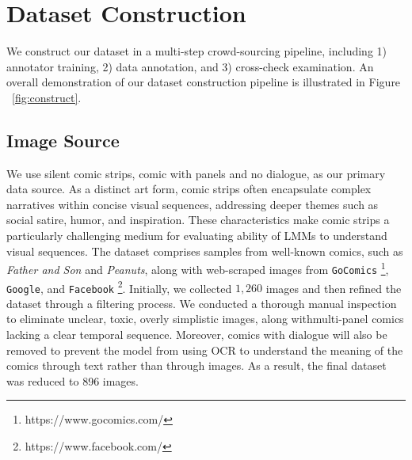\section{Dataset Construction}




We construct our \dataset dataset in a multi-step crowd-sourcing pipeline, including 1) annotator training, 2) data annotation, and 3) cross-check examination. An overall demonstration of our dataset construction pipeline is illustrated in Figure ~\ref{fig:construct}. 

\subsection{Image Source}

We use silent comic strips, comic with panels and no dialogue, as our primary data source. As a distinct art form, comic strips often encapsulate complex narratives within concise visual sequences, addressing deeper themes such as social satire, humor, and inspiration. These characteristics make comic strips a particularly challenging medium for evaluating ability of LMMs to understand visual sequences. 
The dataset comprises samples from well-known comics, such as \textit{Father and Son} and \textit{Peanuts}, along with web-scraped images from \texttt{GoComics} \footnote{https://www.gocomics.com/}, \texttt{Google}, and \texttt{Facebook} \footnote{https://www.facebook.com/}. 
Initially, we collected $1,260$ images and then refined the dataset through a filtering process. We conducted a thorough manual inspection to eliminate unclear, toxic, overly simplistic images, along withmulti-panel comics lacking a clear temporal sequence. Moreover, comics with dialogue will also be removed to prevent the model from using OCR to understand the meaning of the comics through text rather than through images. As a result, the final dataset was reduced to 896 images.


